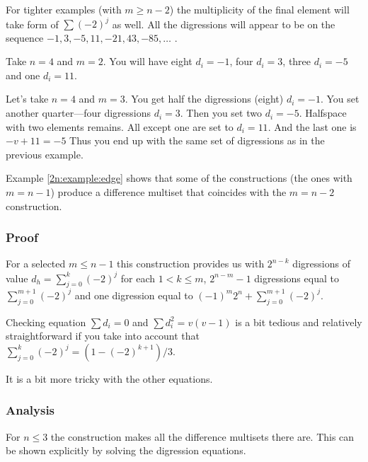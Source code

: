         For tighter examples (with $m\geq n-2$) the multiplicity of the final element will take form of $\sum (-2)^j$ as well. All the digressions will appear to be on the sequence $-1,3,-5,11,-21,43,-85,\ldots$ \cite{A077925}.
        
        \begin{example}
          Take $n=4$ and $m=2$. You will have eight $d_i=-1$, four $d_i=3$, three $d_i=-5$ and one $d_i=11$.
        \end{example}
        
        \begin{example}
            \label{2n:example:edge}
            Let's take $n=4$ and $m=3$. You get half the digressions (eight) $d_i=-1$. You set another quarter---four digressions $d_i=3$. Then you set two $d_i=-5$. Halfspace with two elements remains. All except one are set to $d_i=11$. And the last one is $-v+11=-5$ Thus you end up with the same set of digressions as in the previous example.
        \end{example}

        Example \ref{2n:example:edge} shows that some of the constructions (the ones with $m=n-1$) produce a difference multiset that coincides with the $m=n-2$ construction.
    
    \subsubsection{Proof}
        For a selected $m \leq n-1$ this construction provides us with $2^{n-k}$ digressions of value $d_h=\sum\limits_{j=0}^k(-2)^j$ for each $1<k\leq m$, $2^{n-m}-1$ digressions equal to $\sum\limits_{j=0}^{m+1}(-2)^j$ and one digression equal to $(-1)^m 2^n+\sum\limits_{j=0}^{m+1}(-2)^j$.
        
        Checking equation $\sum d_i = 0$ and $\sum d_i^2 = v(v-1)$ is a bit tedious and relatively straightforward if you take into account that $\sum\limits_{j=0}^k(-2)^j=(1-(-2)^{k+1})/3$.
        
        It is a bit more tricky with the other equations.
        
    
    \subsubsection{Analysis}
        For $n \leq 3$ the construction makes all the difference multisets there are. This can be shown explicitly by solving the digression equations.
    
        
